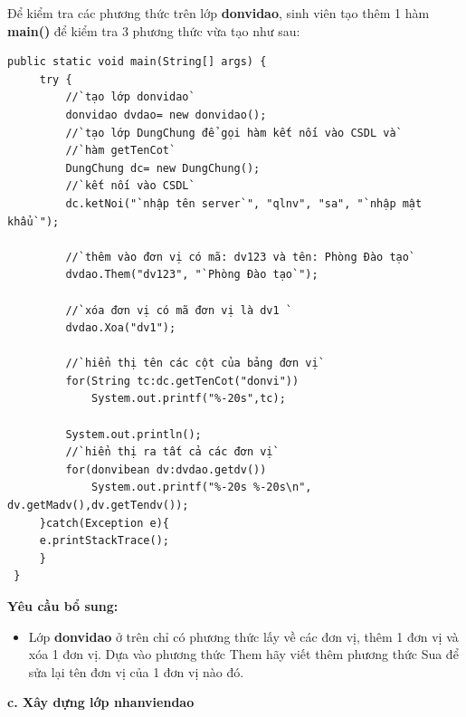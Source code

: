  Để kiểm tra các  phương thức trên lớp \textbf{donvidao}, sinh viên tạo thêm  1 hàm \textbf{main()} để kiểm tra 3 phương thức vừa tạo như sau:
 \begin{lstlisting}[escapechar=`]
 public static void main(String[] args) {
	 try {
		 //`tạo lớp donvidao`
		 donvidao dvdao= new donvidao();
		 //`tạo lớp DungChung để gọi hàm kết nối vào CSDL và`
		 //`hàm getTenCot`
		 DungChung dc= new DungChung();
		 //`kết nối vào CSDL`
		 dc.ketNoi("`nhập tên server`", "qlnv", "sa", "`nhập mật khẩu`");
		 
		 //`thêm vào đơn vị có mã: dv123 và tên: Phòng Đào tạo`
		 dvdao.Them("dv123", "`Phòng Đào tạo`");
		 
		 //`xóa đơn vị có mã đơn vị là dv1 `
		 dvdao.Xoa("dv1");
		 
		 //`hiển thị tên các cột của bảng đơn vị`
		 for(String tc:dc.getTenCot("donvi"))
			 System.out.printf("%-20s",tc);
		 
		 System.out.println();
		 //`hiển thị ra tất cả các đơn vị`
		 for(donvibean dv:dvdao.getdv())
			 System.out.printf("%-20s %-20s\n", dv.getMadv(),dv.getTendv());
	 }catch(Exception e){
	 e.printStackTrace();
	 }
 }	
  \end{lstlisting}
 \textbf{Yêu cầu bổ sung:}
 \begin{itemize}
 	\item Lớp \textbf{donvidao} ở trên chỉ có phương thức lấy về các đơn vị, thêm 1 đơn vị và xóa 1 đơn vị. Dựa vào phương thức Them hãy viết thêm phương thức Sua để sửa lại tên đơn vị của 1 đơn vị nào đó.
 \end{itemize}
 \textbf{ c. Xây dựng lớp nhanviendao}
 
